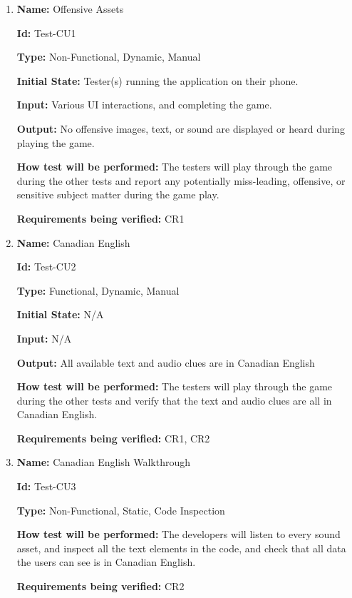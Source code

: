 \documentclass[12pt, titlepage]{article}
\begin{document}
\begin{enumerate}

\item{\textbf{Name:} Offensive Assets} \label{itm:Test-CU1}

\textbf{Id:} Test-CU1

\textbf{Type:} Non-Functional, Dynamic, Manual
					
\textbf{Initial State:} Tester(s) running the application on their phone.
					
\textbf{Input:} Various UI interactions, and completing the game. 
					
\textbf{Output:} No offensive images, text, or sound are displayed or heard during playing the game.
					
\textbf{How test will be performed:} The testers will play through the game during the other tests and report any potentially miss-leading, offensive, or sensitive subject matter during the game play.

\textbf{Requirements being verified:} CR1
					
\item{\textbf{Name:} Canadian English} \label{itm:Test-CU2}

\textbf{Id:} Test-CU2

\textbf{Type:} Functional, Dynamic, Manual
					
\textbf{Initial State:} N/A
					
\textbf{Input:} N/A
					
\textbf{Output:} All available text and audio clues are in Canadian English
					
\textbf{How test will be performed:} The testers will play through the game during the other tests and verify that the text and audio clues are all in Canadian English. 

\textbf{Requirements being verified:} CR1, CR2

\item{\textbf{Name:} Canadian English Walkthrough} \label{itm:Test-CU3}

\textbf{Id:} Test-CU3

\textbf{Type:} Non-Functional, Static, Code Inspection
									
\textbf{How test will be performed:} The developers will listen to every sound asset, and inspect all the text elements in the code, and check that all data the users can see is in Canadian English.

\textbf{Requirements being verified:} CR2

\end{enumerate}
\end{document}
